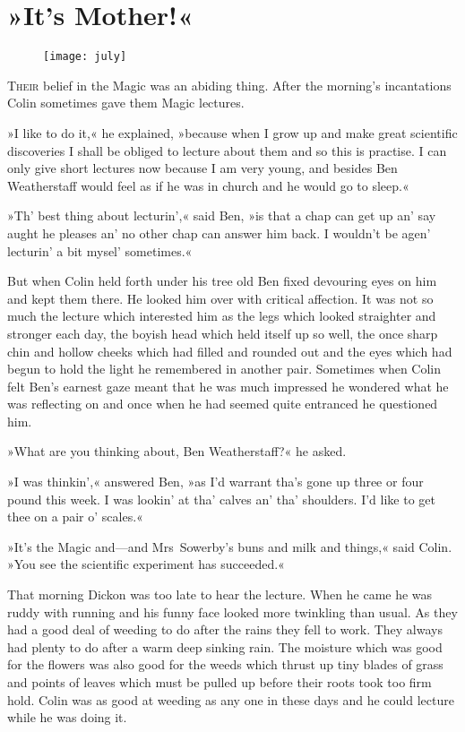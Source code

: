 \chapter{»It's Mother!«} 
	
\begin{figure}[t!]
\centering
\texttt{[image: july]}
\end{figure}

 \lettrine[lines=6]{T}{heir} belief in the Magic was an abiding thing. After the morning's incantations Colin sometimes gave them Magic lectures.

\zz
»I like to do it,« he explained, »because when I grow up and make great scientific discoveries I shall be obliged to lecture about them and so this is practise. I can only give short lectures now because I am very young, and besides Ben Weatherstaff would feel as if he was in church and he would go to sleep.«

»Th' best thing about lecturin',« said Ben, »is that a chap can get up an' say aught he pleases an' no other chap can answer him back. I wouldn't be agen' lecturin' a bit mysel' sometimes.«

But when Colin held forth under his tree old Ben fixed devouring eyes on him and kept them there. He looked him over with critical affection. It was not so much the lecture which interested him as the legs which looked straighter and stronger each day, the boyish head which held itself up so well, the once sharp chin and hollow cheeks which had filled and rounded out and the eyes which had begun to hold the light he remembered in another pair. Sometimes when Colin felt Ben's earnest gaze meant that he was much impressed he wondered what he was reflecting on and once when he had seemed quite entranced he questioned him.

»What are you thinking about, Ben Weatherstaff?« he asked.

»I was thinkin',« answered Ben, »as I'd warrant tha's gone up three or four pound this week. I was lookin' at tha' calves an' tha' shoulders. I'd like to get thee on a pair o' scales.«

»It's the Magic and—and Mrs~Sowerby's buns and milk and things,« said Colin. »You see the scientific experiment has succeeded.«

That morning Dickon was too late to hear the lecture. When he came he was ruddy with running and his funny face looked more twinkling than usual. As they had a good deal of weeding to do after the rains they fell to work. They always had plenty to do after a warm deep sinking rain. The moisture which was good for the flowers was also good for the weeds which thrust up tiny blades of grass and points of leaves which must be pulled up before their roots took too firm hold. Colin was as good at weeding as any one in these days and he could lecture while he was doing it.

